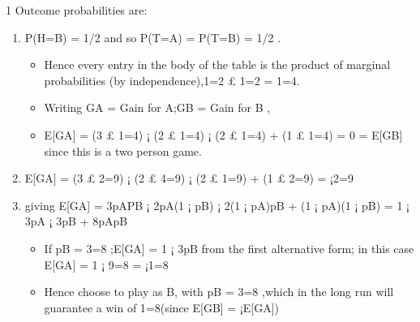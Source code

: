 \documentclass[a4paper,12pt]{article}
\begin{document}
1 Outcome probabilities are:
\begin{enumerate}
    \item  P(H=B) = 1/2 and so P(T=A) = P(T=B) = 1/2 .
    \begin{itemize}
        \item Hence every entry in the body of the table is the product of marginal probabilities (by
independence),1=2 £ 1=2 = 1=4.
\item Writing GA = Gain for A;GB = Gain for B ,
\item E[GA] = (3 £ 1=4) ¡ (2 £ 1=4) ¡ (2 £ 1=4) + (1 £ 1=4) = 0 = E[GB]
since this is a two person game.
    \end{itemize}

\item E[GA] = (3 £ 2=9) ¡ (2 £ 4=9) ¡ (2 £ 1=9) + (1 £ 2=9) = ¡2=9
\item giving E[GA] = 3pAPB ¡ 2pA(1 ¡ pB) ¡ 2(1 ¡ pA)pB + (1 ¡ pA)(1 ¡ pB) = 1 ¡ 3pA ¡
3pB + 8pApB
\begin{itemize}
\item If pB = 3=8 ;E[GA] = 1 ¡ 3pB from the first alternative form; in this case E[GA] =
1 ¡ 9=8 = ¡1=8
\item Hence choose to play as B, with pB = 3=8 ,which in the long run will guarantee a win of
1=8(since E[GB] = ¡E[GA])
\end{itemize}
\end{enumerate}
\end{document}

